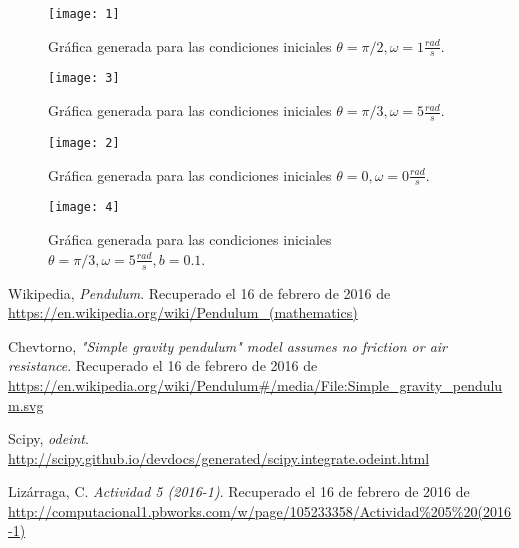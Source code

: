 \documentclass[12pt]{article}
\begin{document}
\begin{figure}[H]
\centering
\texttt{[image: 1]}
\caption{Gráfica generada para las condiciones iniciales $\theta=\pi/2, \omega=1 \frac{rad}{s}$.}
\end{figure}

\begin{figure}[H]
\centering
\texttt{[image: 3]}
\caption{Gráfica generada para las condiciones iniciales $\theta=\pi/3, \omega=5 \frac{rad}{s}$.}
\end{figure}

\begin{figure}[H]
\centering
\texttt{[image: 2]}
\caption{Gráfica generada para las condiciones iniciales $\theta=0, \omega=0 \frac{rad}{s}$.}
\end{figure}

\begin{figure}[H]
\centering
\texttt{[image: 4]}
\caption{Gráfica generada para las condiciones iniciales $\theta=\pi/3, \omega=5 \frac{rad}{s}, b=0.1$.}
\end{figure}

\begin{thebibliography}{6}

Wikipedia,
\emph{Pendulum}. Recuperado el 16 de febrero de 2016 de \url{https://en.wikipedia.org/wiki/Pendulum\_(mathematics)}

Chevtorno,
\emph{"Simple gravity pendulum" model assumes no friction or air resistance}. Recuperado el 16 de febrero de 2016 de \url{https://en.wikipedia.org/wiki/Pendulum#/media/File:Simple_gravity_pendulum.svg}

Scipy,
\emph{odeint}. \url{http://scipy.github.io/devdocs/generated/scipy.integrate.odeint.html}

Lizárraga, C.
\emph{Actividad 5 (2016-1)}. Recuperado el 16 de febrero de 2016 de \url{http://computacional1.pbworks.com/w/page/105233358/Actividad\%205\%20(2016-1)}

\end{thebibliography}
\end{document}
